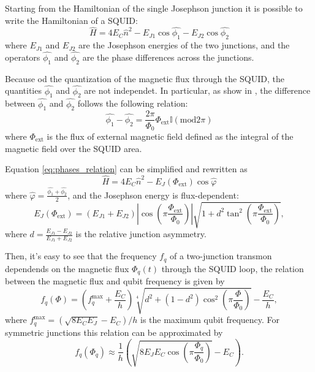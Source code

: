 Starting from the Hamiltonian of the single Josephson junction it is possible to write the Hamiltonian of a SQUID:
\begin{equation}\label{eq:SQUID_Hamiltonian}
    \hat{H} = 4E_C\hat{n}^2 - E_{J1}\cos{\hat{\phi_1}} - E_{J2}\cos{\hat{\phi_2}}
\end{equation}
where $E_{J1}$ and $E_{J2}$ are the Josephson energies of the two junctions, and the operators $\hat{\phi_1}$ and $\hat{\phi_2}$ are the phase differences across the junctions.

Because od the quantization of the magnetic flux through the SQUID, the quantities $\hat{\phi_1}$ and $\hat{\phi_2}$ are not independet. 
In particular, as show in \cite{manenti_quantum_2023}, the difference between $\hat{\phi_1}$ and $\hat{\phi_2}$ follows the following relation:
\begin{equation}\label{eq:phases_relation}
    \hat{\phi_1} - \hat{\phi_2} = \frac{2\pi}{\Phi_0}\Phi_{\text{ext}}\mathbb{I}(\text{mod}2\pi)
\end{equation}
where $\Phi_{\text{ext}}$ is the flux of external magnetic field defined as the integral of the magnetic field over the SQUID area.

Equation \ref{eq:phases_relation} can be simplified and rewritten as 
\begin{equation}\label{eq:tunable_transmon_hamiltonian}
    \hat{H} = 4E_C\hat{n}^2 - E_J(\Phi_{\text{ext}})\cos{\hat{\varphi}}
\end{equation}
where $\hat{\varphi} = \frac{\hat{\phi_1}+\hat{\phi_2}}{2}$, and the Josephson energy is flux-dependent: 
\begin{equation}\label{eq:EJ_tunable}
    E_J(\Phi_{\text{ext}}) = (E_{J1} + E_{J2}) \left| \cos \left( \pi \frac{\Phi_{\text{ext}}}{\Phi_0} \right) \right| \sqrt{1 + d^2 \tan^2 \left( \pi \frac{\Phi_{\text{ext}}}{\Phi_0} \right) },
\end{equation}
where $d = \frac{E_{J1}-E_{J2}}{E_{J1}+E_{J2}}$ is the relative junction asymmetry.

Then, it's easy to see that the frequency $f_q$ of a two-junction transmon dependends on the magnetic flux $\Phi_q(t)$ through the SQUID loop, the relation between the magnetic flux and qubit frequency is given by \cite{PhysRevApplied.20.024070}
\begin{equation}\label{eq:freqdepndenceonflux}
    f_q(\Phi) = \left( f_q^{\text{max}} + \frac{E_C}{h} \right) \sqrt[4]{d^2 + (1 - d^2) \cos^2 \left( \pi \frac{\Phi}{\Phi_0} \right)} - \frac{E_C}{h},
\end{equation}
where $f_q^{\text{max}} = (\sqrt{8E_C E_J}-E_C)/h$ is the maximum qubit frequency. For symmetric junctions this relation can be approximated by \cite{rol_time-domain_2020}
\begin{equation}\label{eq:freqdepndenceonflux_approx}
    f_q(\Phi_q) \approx \frac{1}{h} \left( \sqrt{8E_J E_C \cos\left(\pi \frac{\Phi_q}{\Phi_0} \right)} - E_C \right).    
\end{equation}

